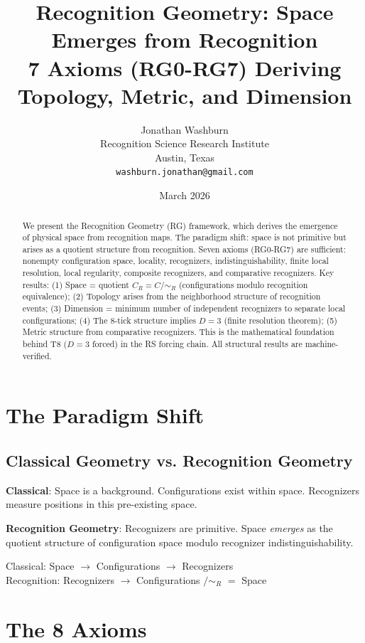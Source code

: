 \documentclass[12pt,a4paper]{article}
\title{Recognition Geometry: Space Emerges from Recognition\\
7 Axioms (RG0-RG7) Deriving Topology, Metric, and Dimension}
\author{Jonathan Washburn\\
Recognition Science Research Institute\\
Austin, Texas\\
\texttt{washburn.jonathan@gmail.com}}
\date{March 2026}
\theoremstyle{definition}
\theoremstyle{remark}
\begin{document}
\maketitle

\begin{abstract}
We present the Recognition Geometry (RG) framework, which derives the emergence 
of physical space from recognition maps. The paradigm shift: space is not 
primitive but arises as a quotient structure from recognition.
Seven axioms (RG0-RG7) are sufficient: nonempty configuration space, locality, 
recognizers, indistinguishability, finite local resolution, local regularity, 
composite recognizers, and comparative recognizers.
Key results:
(1) Space = quotient $C_R = C/\sim_R$ (configurations modulo recognition equivalence);
(2) Topology arises from the neighborhood structure of recognition events;
(3) Dimension = minimum number of independent recognizers to separate local configurations;
(4) The 8-tick structure implies $D = 3$ (finite resolution theorem);
(5) Metric structure from comparative recognizers.
This is the mathematical foundation behind T8 ($D = 3$ forced) in the RS forcing chain.
All structural results are machine-verified.
\end{abstract}

\section{The Paradigm Shift}

\subsection{Classical Geometry vs. Recognition Geometry}

\textbf{Classical}: Space is a background. Configurations exist within space. 
Recognizers measure positions in this pre-existing space.

\textbf{Recognition Geometry}: Recognizers are primitive. Space \emph{emerges} 
as the quotient structure of configuration space modulo recognizer indistinguishability.

\begin{center}
Classical: Space $\to$ Configurations $\to$ Recognizers \\
Recognition: Recognizers $\to$ Configurations $/\!\sim_R$ $=$ Space
\end{center}

\section{The 8 Axioms}
\end{document}
